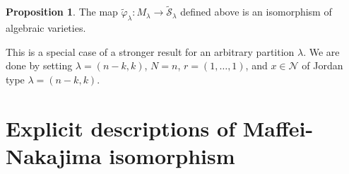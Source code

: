 \documentclass[11pt,reqno]{amsart}
\numberwithin{equation}{section}
\theoremstyle{definition}
\newtheorem{prop}[theorem]{Proposition}
\DeclareMathOperator{\Hom}{{Hom}}
\newcommand{\cN}{\mathcal{N}}
\newcommand{\cS}{\mathcal{S}}
\newcommand{\ld}{\lambda}
\newcommand{\tcS}{\widetilde{\cS}}
\newcommand{\tphi}{\widetilde{\varphi}}
\begin{document}





 

\begin{prop} \label{prop:MS2}
The map $\tphi_{\ld}: M_{\ld} \to \tcS_{\ld}$ defined above is an isomorphism of algebraic varieties.
\end{prop}
 \proof
 This is a special case of a stronger result \cite[Thm. 8]{Maf05} for an arbitrary partition $\ld$. We are done by setting $\ld = (n-k,k)$, $N = n$, $r = (1, \ldots, 1)$, and $x\in\cN$ of Jordan type $\ld = (n-k,k)$.
 \endproof


\section{Explicit descriptions of Maffei-Nakajima isomorphism} \label{sec:exp}
\end{document}
